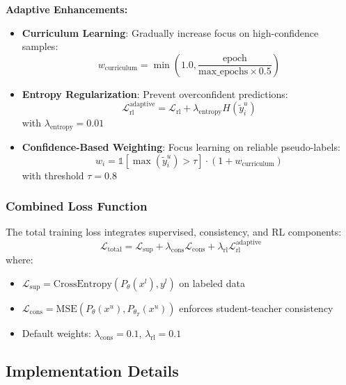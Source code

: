 \documentclass{scrartcl}
\begin{document}
\textbf{Adaptive Enhancements:}
\begin{itemize}
    \item \textbf{Curriculum Learning}: Gradually increase focus on high-confidence samples:
    \begin{equation}
    w_{\text{curriculum}} = \min\left(1.0, \frac{\text{epoch}}{\text{max\_epochs} \times 0.5}\right)
    \end{equation}
    
    \item \textbf{Entropy Regularization}: Prevent overconfident predictions:
    \begin{equation}
    \mathcal{L}_{\text{rl}}^{\text{adaptive}} = \mathcal{L}_{\text{rl}} + \lambda_{\text{entropy}} H(\tilde{y}_i^u)
    \end{equation}
    with $\lambda_{\text{entropy}} = 0.01$
    
    \item \textbf{Confidence-Based Weighting}: Focus learning on reliable pseudo-labels:
    \begin{equation}
    w_i = \mathbb{1}[\max(\tilde{y}_i^u) > \tau] \cdot (1 + w_{\text{curriculum}})
    \end{equation}
    with threshold $\tau = 0.8$
\end{itemize}

\subsubsection{Combined Loss Function}

The total training loss integrates supervised, consistency, and RL components:
\begin{equation}
\mathcal{L}_{\text{total}} = \mathcal{L}_{\text{sup}} + \lambda_{\text{cons}} \mathcal{L}_{\text{cons}} + \lambda_{\text{rl}} \mathcal{L}_{\text{rl}}^{\text{adaptive}}
\end{equation}
where:
\begin{itemize}
    \item $\mathcal{L}_{\text{sup}} = \text{CrossEntropy}(P_\theta(x^l), y^l)$ on labeled data
    \item $\mathcal{L}_{\text{cons}} = \text{MSE}(P_\theta(x^u), P_{\theta_T}(x^u))$ enforces student-teacher consistency
    \item Default weights: $\lambda_{\text{cons}} = 0.1$, $\lambda_{\text{rl}} = 0.1$
\end{itemize}

\subsection{Implementation Details}
\end{document}
